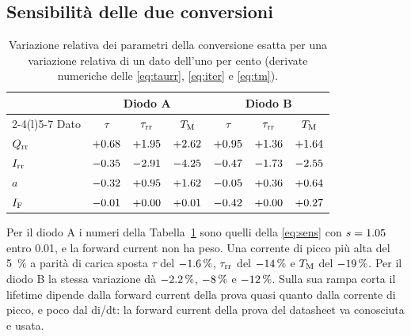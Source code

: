 \documentclass[10pt,a4paper]{scrartcl}
\let\newcommand\pdvaluedefine
\newcommand{\IF}{I_\mathrm{F}}
\newcommand{\Irr}{I_\mathrm{rr}}
\newcommand{\Qrr}{Q_\mathrm{rr}}
\newcommand{\taurr}{\tau_\mathrm{rr}}
\newcommand{\TM}{T_\mathrm{M}}
\begin{document}
\subsection{Sensibilità delle due conversioni}
\begin{table}[htb]
\centering\small
\caption{Variazione relativa dei parametri della conversione esatta per una variazione relativa di un dato dell'uno per cento (derivate numeriche delle \eqref{eq:taurr}, \eqref{eq:iter} e \eqref{eq:tm}).}
\label{tab:sensex}
\begin{tabular}{@{}lcccccc@{}}
\toprule
 & \multicolumn{3}{c}{Diodo A} & \multicolumn{3}{c}{Diodo B} \\
\cmidrule(lr){2-4}\cmidrule(l){5-7}
Dato & $\tau$ & $\taurr$ & $\TM$ & $\tau$ & $\taurr$ & $\TM$ \\
\midrule
$\Qrr$ & $+0.68$ & $+1.95$ & $+2.62$ & $+0.95$ & $+1.36$ & $+1.64$ \\
$\Irr$ & $-0.35$ & $-2.91$ & $-4.25$ & $-0.47$ & $-1.73$ & $-2.55$ \\
$a$ & $-0.32$ & $+0.95$ & $+1.62$ & $-0.05$ & $+0.36$ & $+0.64$ \\
$\IF$ & $-0.01$ & $+0.00$ & $+0.01$ & $-0.42$ & $+0.00$ & $+0.27$ \\
\bottomrule
\end{tabular}
\end{table}
Per il diodo A i numeri della Tabella~\ref{tab:sensex} sono quelli della \eqref{eq:sens} con $s = 1.05$ entro \num{0.01}, e la forward current non ha peso. Una corrente di picco più alta del \SI{5}{\percent} a parità di carica sposta $\tau$ del $-1.6\,\%$, $\taurr$ del $-14\,\%$ e $\TM$ del $-19\,\%$. Per il diodo B la stessa variazione dà $-2.2\,\%$, $-8\,\%$ e $-12\,\%$. Sulla sua rampa corta il lifetime dipende dalla forward current della prova quasi quanto dalla corrente di picco, e poco dal di/dt: la forward current della prova del datasheet va conosciuta e usata.

\end{document}
